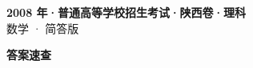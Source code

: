 \documentclass[zihao=-4, a4paper]{ctexart}
\begin{document}
\begin{center}
  {\Large\bfseries 2008 年·普通高等学校招生考试·陕西卷·理科}\\[4pt]
  {\large 数学 · 简答版}
\end{center}
\medskip
{}

\clearpage
{}
\begin{center}{\Large\bfseries 答案速查}\end{center}
\medskip

\end{document}
